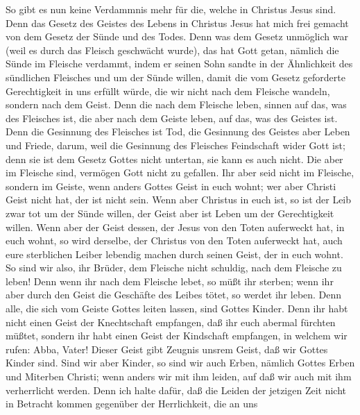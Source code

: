  So gibt es nun keine Verdammnis mehr für die, welche in
Christus Jesus sind.  Denn das Gesetz des Geistes des
Lebens in Christus Jesus hat mich frei gemacht von dem Gesetz der Sünde
und des Todes.  Denn was dem Gesetz unmöglich war (weil es
durch das Fleisch geschwächt wurde), das hat Gott getan, nämlich die
Sünde im Fleische verdammt, indem er seinen Sohn sandte in der
Ähnlichkeit des sündlichen Fleisches und um der Sünde willen,
 damit die vom Gesetz geforderte Gerechtigkeit in uns
erfüllt würde, die wir nicht nach dem Fleische wandeln, sondern nach dem
Geist.  Denn die nach dem Fleische leben, sinnen auf das,
was des Fleisches ist, die aber nach dem Geiste leben, auf das, was des
Geistes ist.  Denn die Gesinnung des Fleisches ist Tod,
die Gesinnung des Geistes aber Leben und Friede,  darum,
weil die Gesinnung des Fleisches Feindschaft wider Gott ist; denn sie
ist dem Gesetz Gottes nicht untertan, sie kann es auch nicht.
 Die aber im Fleische sind, vermögen Gott nicht zu
gefallen.  Ihr aber seid nicht im Fleische, sondern im
Geiste, wenn anders Gottes Geist in euch wohnt; wer aber Christi Geist
nicht hat, der ist nicht sein.  Wenn aber Christus in
euch ist, so ist der Leib zwar tot um der Sünde willen, der Geist aber
ist Leben um der Gerechtigkeit willen.  Wenn aber der
Geist dessen, der Jesus von den Toten auferweckt hat, in euch wohnt, so
wird derselbe, der Christus von den Toten auferweckt hat, auch eure
sterblichen Leiber lebendig machen durch seinen Geist, der in euch
wohnt.  So sind wir also, ihr Brüder, dem Fleische nicht
schuldig, nach dem Fleische zu leben!  Denn wenn ihr nach
dem Fleische lebet, so müßt ihr sterben; wenn ihr aber durch den Geist
die Geschäfte des Leibes tötet, so werdet ihr leben. 
Denn alle, die sich vom Geiste Gottes leiten lassen, sind Gottes Kinder.
 Denn ihr habt nicht einen Geist der Knechtschaft
empfangen, daß ihr euch abermal fürchten müßtet, sondern ihr habt einen
Geist der Kindschaft empfangen, in welchem wir rufen: Abba, Vater!
 Dieser Geist gibt Zeugnis unsrem Geist, daß wir Gottes
Kinder sind.  Sind wir aber Kinder, so sind wir auch
Erben, nämlich Gottes Erben und Miterben Christi; wenn anders wir mit
ihm leiden, auf daß wir auch mit ihm verherrlicht werden.
 Denn ich halte dafür, daß die Leiden der jetzigen Zeit
nicht in Betracht kommen gegenüber der Herrlichkeit, die an uns
